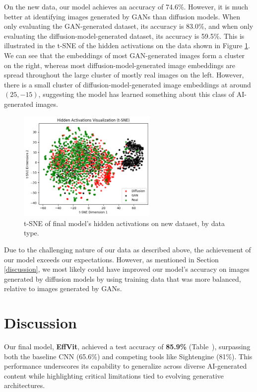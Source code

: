 \documentclass{article} %
\begin{document}
On the new data, our model achieves an accuracy of 74.6\%. However, it is much better at identifying images generated by GANs than diffusion models. When only evaluating the GAN-generated dataset, its accuracy is 83.0\%, and when only evaluating the diffusion-model-generated dataset, its accuracy is 59.5\%. This is illustrated in the t-SNE of the hidden activations on the data shown in Figure \ref{fig:new_data_tsne}. We can see that the embeddings of most GAN-generated images form a cluster on the right, whereas most diffusion-model-generated image embeddings are spread throughout the large cluster of mostly real images on the left. However, there is a small cluster of diffusion-model-generated image embeddings at around $(25, -15)$, suggesting the model has learned something about this class of AI-generated images.

\begin{figure}[h]
    \begin{center}
        \includegraphics[width=0.6\textwidth]{figs/tsne.png}
    \end{center}
    \caption{t-SNE of final model's hidden activations on new dataset, by data type.}
    \label{fig:new_data_tsne}
\end{figure}

Due to the challenging nature of our data as described above, the achievement of our model exceeds our expectations. However, as mentioned in Section \ref{discussion}, we most likely could have improved our model's accuracy on images generated by diffusion models by using training data that was more balanced, relative to images generated by GANs.

\section{Discussion}
Our final model, \textbf{EffVit}, achieved a test accuracy of \textbf{85.9\%} (Table~), surpassing both the baseline CNN (65.6\%) and competing tools like Sightengine (81\%). This performance underscores its capability to generalize across diverse AI-generated content while highlighting critical limitations tied to evolving generative architectures.
\end{document}

